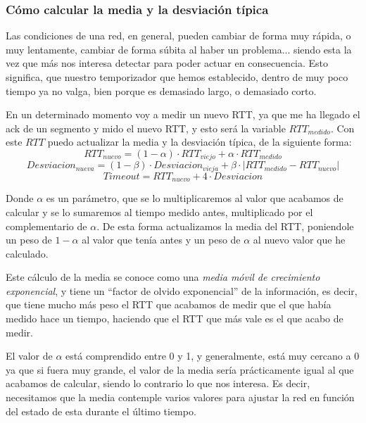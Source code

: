 \documentclass[10pt,a4paper,spanish]{report}
\begin{document}
\subsubsection{\textcolor{tema3}Cómo calcular la media y la desviación típica}

Las condiciones de una red, en general, pueden cambiar de forma muy rápida, o muy lentamente, cambiar de forma súbita al haber un problema... siendo esta la vez que más nos interesa detectar para poder actuar en consecuencia. Esto significa, que nuestro temporizador que hemos establecido, dentro de muy poco tiempo ya no valga, bien porque es demasiado largo, o demasiado corto. 

En un determinado momento voy a medir un nuevo RTT, ya que me ha llegado el ack de un segmento y mido el nuevo RTT, y esto será la variable $RTT_{medido}$. Con este $RTT$ puedo actualizar la media y la desviación típica, de la siguiente forma:
\begin{displaymath}
  RTT_{nuevo} = (1-\alpha) \cdot RTT_{viejo} + \alpha \cdot RTT_{medido}
\end{displaymath}
\begin{displaymath}
  Desviacion_{nueva} = (1-\beta) \cdot Desviacion_{vieja} + \beta \cdot |RTT_{medido} - RTT_{nuevo}|
\end{displaymath}
\begin{displaymath}
  Timeout = RTT_{nuevo} + 4 \cdot Desviacion
\end{displaymath}

Donde $\alpha$ es un parámetro, que se lo multiplicaremos al valor que acabamos de calcular y se lo sumaremos al tiempo medido antes, multiplicado por el complementario de $\alpha$. De esta forma actualizamos la media del RTT, poniendole un peso de $1 - \alpha$ al valor que tenía antes y un peso de $\alpha$ al nuevo valor que he calculado. 

Este cálculo de la media se conoce como una \textit{\textcolor{tema3}{media móvil de crecimiento exponencial}}, y tiene un ``factor de olvido exponencial'' de la información, es decir, que tiene mucho más peso el RTT que acabamos de medir que el que había medido hace un tiempo, haciendo que el RTT que más vale es el que acabo de medir. 

El valor de $\alpha$ está comprendido entre 0 y 1, y generalmente, está muy cercano a 0 ya que si fuera muy grande, el valor de la media sería prácticamente igual al que acabamos de calcular, siendo lo contrario lo que nos interesa. Es decir, necesitamos que la media contemple varios valores para ajustar la red en función del estado de esta durante el último tiempo. 
\end{document}
